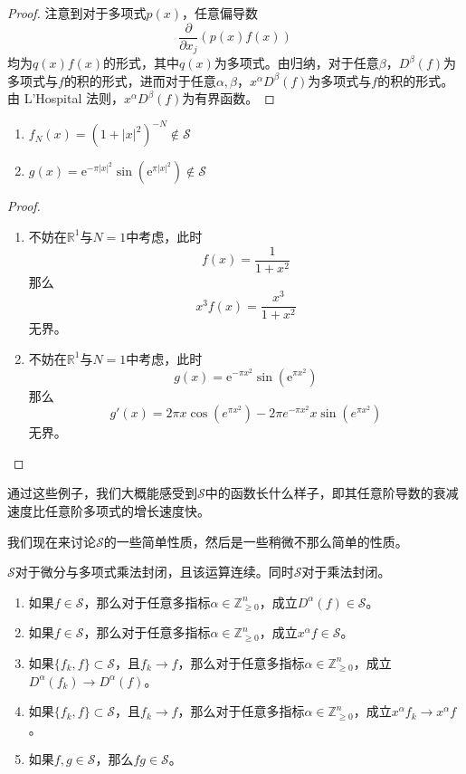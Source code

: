 \documentclass[lang = cn, %
scheme = chinese          %
]
{elegantbook}             %
\newcommand{\R}{\mathbb{R}}            %
\newcommand{\Z}{\mathbb{Z}}            %
\newcommand{\sub}{\subset}             %
\newcommand{\ee}[1]{\mathrm{e}^{#1}}           %
\begin{document}
\begin{proof}
	注意到对于多项式$p(x)$，任意偏导数
	\[
	\frac{\partial}{\partial x_j}(p(x)f(x))
	\]
	均为$q(x)f(x)$的形式，其中$q(x)$为多项式。由归纳，对于任意$\beta$，$D^\beta(f)$为多项式与$f$的积的形式，进而对于任意$\alpha,\beta$，$x^\alpha D^\beta(f)$为多项式与$f$的积的形式。由 L'Hospital 法则，$x^\alpha D^\beta(f)$为有界函数。
\end{proof}

\begin{example}
	\begin{enumerate}
		\item $f_N(x)=(1+|x|^2)^{-N}\notin \mathcal{S}$
		\item $g(x)=\ee{-\pi|x|^2}\sin(\ee{\pi |x|^2})\notin \mathcal{S}$
	\end{enumerate}
\end{example}

\begin{proof}
	\begin{enumerate}
		\item 不妨在$\R^1$与$N=1$中考虑，此时
		\[
		f(x)=\frac{1}{1+x^2}
		\]
		那么
		\[
		x^3f(x)=\frac{x^3}{1+x^2}
		\]
		无界。
		\item 不妨在$\R^1$与$N=1$中考虑，此时
		\[
		g(x)=\ee{-\pi x^2}\sin(\ee{\pi x^2})
		\]
		那么
		\[
		g'(x)=2 \pi  x \cos \left(e^{\pi  x^2}\right)-2 \pi  e^{-\pi  x^2} x
		\sin \left(e^{\pi  x^2}\right)
		\]
		无界。
	\end{enumerate}
\end{proof}

\begin{note}
	通过这些例子，我们大概能感受到$\mathcal{S}$中的函数长什么样子，即其任意阶导数的衰减速度比任意阶多项式的增长速度快。
\end{note}

我们现在来讨论$\mathcal{S}$的一些简单性质，然后是一些稍微不那么简单的性质。

\begin{proposition}
	$\mathcal{S}$对于微分与多项式乘法封闭，且该运算连续。同时$\mathcal{S}$对于乘法封闭。
	\begin{enumerate}
		\item 如果$f\in\mathcal{S}$，那么对于任意多指标$\alpha\in\Z_{\ge 0}^n$，成立$D^\alpha(f)\in\mathcal{S}$。
		\item 如果$f\in\mathcal{S}$，那么对于任意多指标$\alpha\in\Z_{\ge 0}^n$，成立$x^\alpha f\in\mathcal{S}$。
		\item 如果$\{ f_k,f \}\sub\mathcal{S}$，且$f_k\to f$，那么对于任意多指标$\alpha\in\Z_{\ge 0}^n$，成立$D^\alpha(f_k)\to D^\alpha(f)$。
		\item 如果$\{ f_k,f \}\sub\mathcal{S}$，且$f_k\to f$，那么对于任意多指标$\alpha\in\Z_{\ge 0}^n$，成立$x^\alpha f_k\to x^\alpha f$。
		\item 如果$f,g\in\mathcal{S}$，那么$fg\in\mathcal{S}$。
	\end{enumerate}
\end{proposition}
\end{document}
